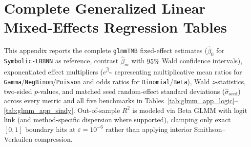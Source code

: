 \section{Complete Generalized Linear Mixed-Effects Regression Tables}
\label{app:glmm_full}

This appendix reports the complete \texttt{glmmTMB} fixed-effect estimates ($\hat{\beta}_0$ for \texttt{Symbolic-LBBNN} as reference, contrast $\hat{\beta}_m$ with $95\%$ Wald confidence intervals), exponentiated effect multipliers ($e^{\hat{\beta}_m}$ representing multiplicative mean ratios for \texttt{Gamma}/\texttt{NegBinom}/\texttt{Poisson} and odds ratios for \texttt{Binomial}/\texttt{Beta}), Wald $z$-statistics, two-sided $p$-values, and matched seed random-effect standard deviations ($\hat{\sigma}_{\text{seed}}$) across every metric and all five benchmarks in Tables~\ref{tab:glmm_app_logic}--\ref{tab:glmm_app_sindy}. Out-of-sample $R^2$ is modeled via Beta GLMM with logit link (and method-specific dispersion where supported), clamping only exact $[0,1]$ boundary hits at $\varepsilon = 10^{-6}$ rather than applying interior Smithson--Verkuilen compression.

